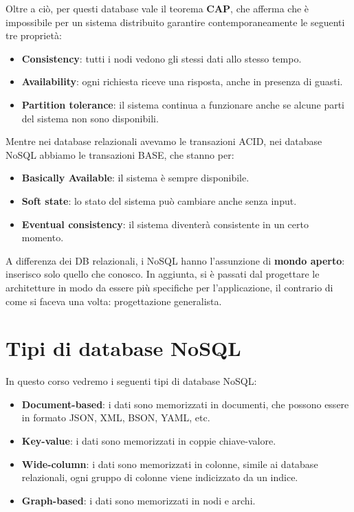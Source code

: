 Oltre a ciò, per questi database vale il teorema \textbf{CAP}, che afferma che è
impossibile per un sistema distribuito garantire contemporaneamente le seguenti
tre proprietà:
\begin{itemize}
      \item \textbf{Consistency}: tutti i nodi vedono gli stessi dati allo stesso
            tempo.
      \item \textbf{Availability}: ogni richiesta riceve una risposta, anche in
            presenza di guasti.
      \item \textbf{Partition tolerance}: il sistema continua a funzionare anche
            se alcune parti del sistema non sono disponibili.
\end{itemize}

Mentre nei database relazionali avevamo le transazioni ACID, nei database NoSQL
abbiamo le transazioni BASE, che stanno per:
\begin{itemize}
      \item \textbf{Basically Available}: il sistema è sempre disponibile.
      \item \textbf{Soft state}: lo stato del sistema può cambiare anche senza
            input.
      \item \textbf{Eventual consistency}: il sistema diventerà consistente in un
            certo momento.
\end{itemize}

A differenza dei DB relazionali, i NoSQL hanno l'assunzione di \textbf{mondo aperto}:
inserisco solo quello che conosco. In aggiunta, si è passati dal progettare le 
architetture in modo da essere più specifiche per l'applicazione, il contrario 
di come si faceva una volta: progettazione generalista.

\section{Tipi di database NoSQL}
In questo corso vedremo i seguenti tipi di database NoSQL:
\begin{itemize}
      \item \textbf{Document-based}: i dati sono memorizzati in documenti, che
            possono essere in formato JSON, XML, BSON, YAML, etc.
      \item \textbf{Key-value}: i dati sono memorizzati in coppie chiave-valore.
      \item \textbf{Wide-column}: i dati sono memorizzati in colonne, simile ai
            database relazionali, ogni gruppo di colonne viene indicizzato da un
            indice.
      \item \textbf{Graph-based}: i dati sono memorizzati in nodi e archi.
\end{itemize}

